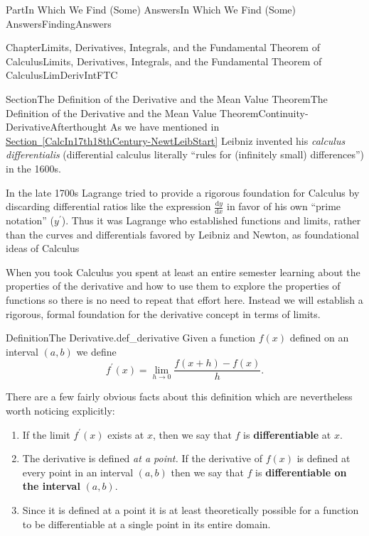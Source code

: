 \documentclass[oneside,10pt,]{book}
\newcommand{\xreffont}{\relax}
\newcommand{\terminology}[1]{\textbf{#1}}
\numberwithin{equation}{part}
\newcommand{\dfdx}[2]{\frac{\text{d}{#1}}{\text{d}{#2}}}
\def\limit#1#2#3{{\displaystyle\lim_{#1\rightarrow #2}#3}}
\begin{document}
\begin{partptx}{Part}{In Which We Find (Some) Answers}{}{In Which We Find (Some) Answers}{}{}{FindingAnswers}
\begin{chapterptx}{Chapter}{Limits, Derivatives, Integrals, and the Fundamental Theorem of Calculus}{}{Limits, Derivatives, Integrals, and the Fundamental Theorem of Calculus}{}{}{LimDerivIntFTC}
\typeout{************************************************}
%
\begin{sectionptx}{Section}{The Definition of  the Derivative and the Mean Value Theorem}{}{The Definition of  the Derivative and the Mean Value Theorem}{}{}{Continuity-DerivativeAfterthought}
As we have mentioned in \hyperref[CalcIn17th18thCentury-NewtLeibStart]{Section~{\xreffont\ref{CalcIn17th18thCentury-NewtLeibStart}}}  Leibniz invented his \textit{calculus differentialis} (differential calculus \textemdash{} literally ``rules for (infinitely small) differences'') in the 1600s.%
\par
In the late 1700s Lagrange tried to provide a rigorous foundation for Calculus by discarding differential ratios like the expression \(\dfdx{y}{x} \) in favor of his own ``prime notation'' (\(y^\prime \)). Thus it was Lagrange who established functions and limits, rather than the curves and differentials favored by Leibniz and Newton, as foundational ideas of Calculus%
\par
When you took Calculus you spent at least an entire semester learning about the properties of the derivative and how to use them to explore the properties of functions so there is no need to repeat that effort here. Instead we will establish a rigorous, formal foundation for the derivative concept in terms of limits.%
\begin{definition}{Definition}{The Derivative.}{def_derivative}%
%
Given a function \(f(x)\) defined on an interval \((a,b)\) we define%
\begin{equation*}
f^\prime(x) =
\limit{h}{0}{\frac{f(x+h)-f(x)}{h}}.{} 
\end{equation*}
%
\end{definition}
There are a few fairly obvious facts about this definition which are nevertheless worth noticing explicitly:%
\par
%
\begin{enumerate}
\item{}If the limit \(f^\prime (x)\) exists at \(x\), then we say that \(f\) is \terminology{differentiable} at \(x\).%
\item{}The derivative is defined \emph{at a point.} If the derivative of \(f(x)\)  is defined at every point in an interval \((a,b)\) then we say that \(f\) is \terminology{differentiable on the interval} \((a,b)\).%
\item{}Since it is defined at a point it is at least theoretically possible for a function to be differentiable at a single point in its entire domain.%

\end{enumerate}
\end{sectionptx}
\end{chapterptx}
\end{partptx}
\end{document}

